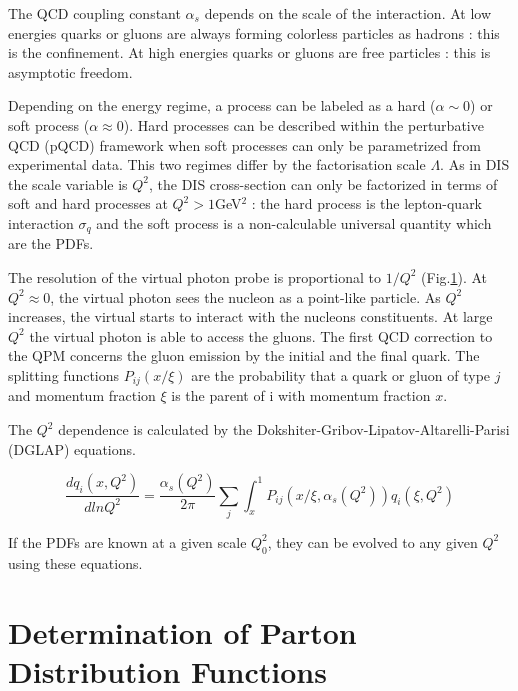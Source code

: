 The QCD coupling constant $\alpha_s$ depends on the scale of the interaction. At low energies quarks or gluons are always
forming colorless particles as hadrons : this is the confinement. At high energies quarks or gluons are free particles :
this is asymptotic freedom.

Depending on the energy regime, a process can be labeled as a hard ($\alpha \sim 0$) or soft process ($\alpha \approx 0$).
Hard processes can be described within the perturbative QCD (pQCD) framework when soft processes can only be parametrized
from experimental data. This two regimes differ by the factorisation scale $\Lambda$. As in DIS the scale variable is $Q^2$,
the DIS cross-section can only be factorized in terms of soft and hard processes at $Q^2>1$GeV$^2$ : the hard process is the
lepton-quark interaction $\sigma_q$ and the soft process is a non-calculable universal quantity which are the PDFs.

The resolution of the virtual photon probe is proportional to $1/Q^2$ (Fig.\ref{}). At $Q^2 \approx 0$, the virtual photon sees the
nucleon as a point-like particle. As $Q^2$ increases, the virtual starts to interact with the nucleons constituents. At large $Q^2$
the virtual photon is able to access the gluons. The first QCD correction to the QPM concerns the gluon emission by the initial and
the final quark. The splitting functions $P_{ij}(x/\xi)$ are the probability that a quark or gluon of type $j$ and momentum fraction
$\xi$ is the parent of i with momentum fraction $x$.


The $Q^2$ dependence is calculated by the Dokshiter-Gribov-Lipatov-Altarelli-Parisi (DGLAP) equations.

\begin{equation}
  \frac{dq_i(x,Q^2)}{dlnQ^2} = \frac{\alpha_s(Q^2)}{2\pi}\sum\limits_{j}\int_{x}^{1}P_{ij}(x/\xi,\alpha_s(Q^2))q_i(\xi,Q^2)
\end{equation}

If the PDFs are known at a given scale $Q_0^2$, they can be evolved to any given $Q^2$ using these equations.


\section{Determination of Parton Distribution Functions}

